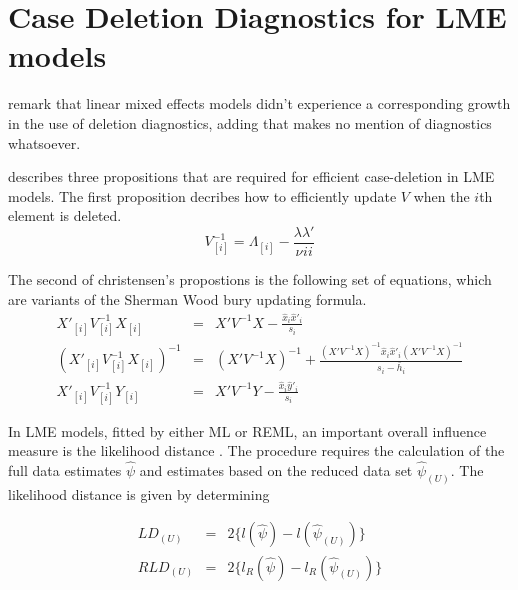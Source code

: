 \documentclass[]{article}
\begin{document}
\section{Case Deletion Diagnostics for LME models}

\citet{HaslettDillane} remark that linear mixed effects models
didn't experience a corresponding growth in the use of deletion
diagnostics, adding that \citet{McCullSearle} makes no mention of
diagnostics whatsoever.

\citet{Christensen} describes three propositions that are required
for efficient case-deletion in LME models. The first proposition
decribes how to efficiently update $V$ when the $i$th element is
deleted.
\begin{equation}
V_{[i]}^{-1} = \Lambda_{[i]} - \frac{\lambda
	\lambda\prime}{\nu^{}ii}
\end{equation}


The second of christensen's propostions is the following set of
equations, which are variants of the Sherman Wood bury updating
formula.
\begin{eqnarray}
X'_{[i]}V_{[i]}^{-1}X_{[i]} &=& X' V^{-1}X -
\frac{\hat{x}_{i}\hat{x}'_{i}}{s_{i}}\\
(X'_{[i]}V_{[i]}^{-1}X_{[i]})^{-1} &=& (X' V^{-1}X)^{-1} +
\frac{(X' V^{-1}X)^{-1}\hat{x}_{i}\hat{x}' _{i}
	(X' V^{-1}X)^{-1}}{s_{i}- \bar{h}_{i}}\\
X'_{[i]}V_{[i]}^{-1}Y_{[i]} &=& X\prime V^{-1}Y -
\frac{\hat{x}_{i}\hat{y}' _{i}}{s_{i}}
\end{eqnarray}








In LME models, fitted by either ML or REML, an important overall
influence measure is the likelihood distance \citep{cook82}. The
procedure requires the calculation of the full data estimates
$\hat{\psi}$ and estimates based on the reduced data set
$\hat{\psi}_{(U)}$. The likelihood distance is given by
determining


\begin{eqnarray}
LD_{(U)} &=& 2\{l(\hat{\psi}) - l( \hat{\psi}_{(U)}) \}\\
RLD_{(U)} &=& 2\{l_{R}(\hat{\psi}) - l_{R}(\hat{\psi}_{(U)})\}
\end{eqnarray}




\end{document}
